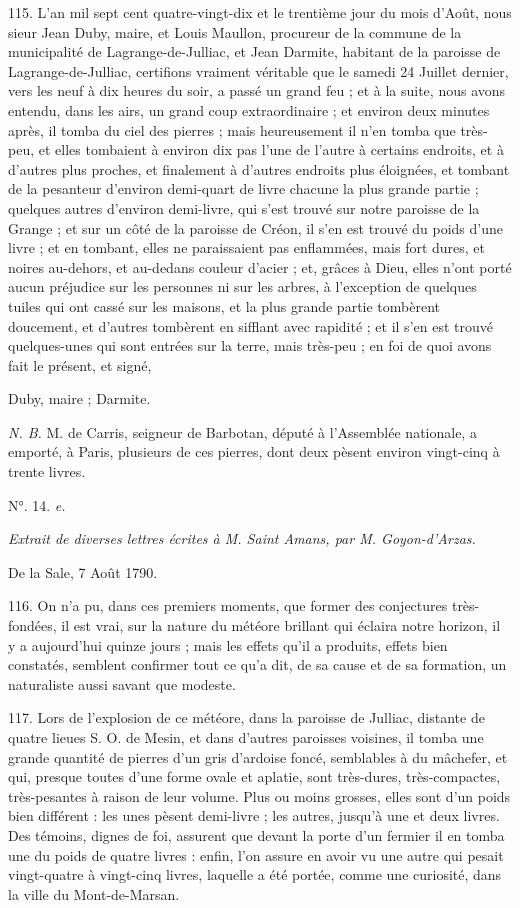 \documentclass[a4paper, 11pt, oneside, polutonikogreek, french]{article}
\begin{document}
115. L'an mil sept cent quatre-vingt-dix et le trentième jour du mois d'Août, nous sieur Jean Duby, maire, et Louis Maullon, procureur de la commune de la municipalité de Lagrange-de-Julliac, et Jean Darmite, habitant de la paroisse de Lagrange-de-Julliac, certifions vraiment véritable que le samedi 24 Juillet dernier, vers les neuf à dix heures du soir, a passé un grand feu ; et à la suite, nous avons entendu, dans les airs, un grand coup extraordinaire ; et environ deux minutes après, il tomba du ciel des pierres ; mais heureusement il n'en tomba que très-peu, et elles tombaient à environ dix pas l'une de l'autre à certains endroits, et à d'autres plus proches, et finalement à d'autres endroits plus éloignées, et tombant de la pesanteur d'environ demi-quart de livre chacune la plus grande partie ; quelques autres d'environ demi-livre, qui s'est trouvé sur notre paroisse de la Grange ; et sur un côté de la paroisse de Créon, il s'en est trouvé du poids d'une livre ; et en tombant, elles ne paraissaient pas enflammées, mais fort dures, et noires au-dehors, et au-dedans couleur d'acier ; et, grâces à Dieu, elles n'ont porté aucun préjudice sur les personnes ni sur les arbres, à l'exception de quelques tuiles qui ont cassé sur les maisons, et la plus grande partie tombèrent doucement, et d'autres tombèrent en sifflant avec rapidité ; et il s'en est trouvé quelques-unes qui sont entrées sur la terre, mais très-peu ; en foi de quoi avons fait le présent, et signé,

Duby, maire ; Darmite.

\emph{N. B.} M. de Carris, seigneur de Barbotan, député à l'Assemblée nationale, a emporté, à Paris, plusieurs de ces pierres, dont deux pèsent environ vingt-cinq à trente livres.

\begin{center}
N°. 14. \emph{e.}
\end{center}

\emph{Extrait de diverses lettres écrites à M. Saint Amans, par M. Goyon-d'Arzas.}

De la Sale, 7 Août 1790.

116. On n'a pu, dans ces premiers moments, que former des conjectures très-fondées, il est vrai, sur la nature du météore brillant qui éclaira notre horizon, il y a aujourd'hui quinze jours ; mais les effets qu'il a produits, effets bien constatés, semblent confirmer tout ce qu'a dit, de sa cause et de sa formation, un naturaliste aussi savant que modeste.

117. Lors de l'explosion de ce météore, dans la paroisse de Julliac, distante de quatre lieues S. O. de Mesin, et dans d'autres paroisses voisines, il tomba une grande quantité de pierres d'un gris d'ardoise foncé, semblables à du mâchefer, et qui, presque toutes d'une forme ovale et aplatie, sont très-dures, très-compactes, très-pesantes à raison de leur volume. Plus ou moins grosses, elles sont d'un poids bien différent : les unes pèsent demi-livre ; les autres, jusqu'à une et deux livres. Des témoins, dignes de foi, assurent que devant la porte d'un fermier il en tomba une du poids de quatre livres : enfin, l'on assure en avoir vu une autre qui pesait vingt-quatre à vingt-cinq livres, laquelle a été portée, comme une curiosité, dans la ville du Mont-de-Marsan.
\end{document}
